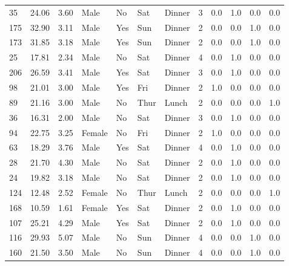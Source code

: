 \documentclass[
  letterpaper,
  DIV=11,
  numbers=noendperiod]{scrreprt}
\begin{document}
\begin{tabular}{lrrllllrrrrr}
35  &       24.06 &  3.60 &    Male &     No &   Sat &  Dinner &     3 &      0.0 &      1.0 &      0.0 &       0.0 \\
175 &       32.90 &  3.11 &    Male &    Yes &   Sun &  Dinner &     2 &      0.0 &      0.0 &      1.0 &       0.0 \\
173 &       31.85 &  3.18 &    Male &    Yes &   Sun &  Dinner &     2 &      0.0 &      0.0 &      1.0 &       0.0 \\
25  &       17.81 &  2.34 &    Male &     No &   Sat &  Dinner &     4 &      0.0 &      1.0 &      0.0 &       0.0 \\
206 &       26.59 &  3.41 &    Male &    Yes &   Sat &  Dinner &     3 &      0.0 &      1.0 &      0.0 &       0.0 \\
98  &       21.01 &  3.00 &    Male &    Yes &   Fri &  Dinner &     2 &      1.0 &      0.0 &      0.0 &       0.0 \\
89  &       21.16 &  3.00 &    Male &     No &  Thur &   Lunch &     2 &      0.0 &      0.0 &      0.0 &       1.0 \\
36  &       16.31 &  2.00 &    Male &     No &   Sat &  Dinner &     3 &      0.0 &      1.0 &      0.0 &       0.0 \\
94  &       22.75 &  3.25 &  Female &     No &   Fri &  Dinner &     2 &      1.0 &      0.0 &      0.0 &       0.0 \\
63  &       18.29 &  3.76 &    Male &    Yes &   Sat &  Dinner &     4 &      0.0 &      1.0 &      0.0 &       0.0 \\
28  &       21.70 &  4.30 &    Male &     No &   Sat &  Dinner &     2 &      0.0 &      1.0 &      0.0 &       0.0 \\
24  &       19.82 &  3.18 &    Male &     No &   Sat &  Dinner &     2 &      0.0 &      1.0 &      0.0 &       0.0 \\
124 &       12.48 &  2.52 &  Female &     No &  Thur &   Lunch &     2 &      0.0 &      0.0 &      0.0 &       1.0 \\
168 &       10.59 &  1.61 &  Female &    Yes &   Sat &  Dinner &     2 &      0.0 &      1.0 &      0.0 &       0.0 \\
107 &       25.21 &  4.29 &    Male &    Yes &   Sat &  Dinner &     2 &      0.0 &      1.0 &      0.0 &       0.0 \\
116 &       29.93 &  5.07 &    Male &     No &   Sun &  Dinner &     4 &      0.0 &      0.0 &      1.0 &       0.0 \\
160 &       21.50 &  3.50 &    Male &     No &   Sun &  Dinner &     4 &      0.0 &      0.0 &      1.0 &       0.0 \\

\end{tabular}
\end{document}

